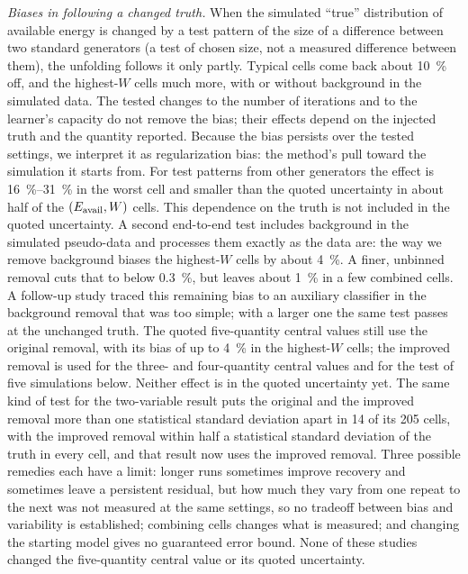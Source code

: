 \emph{Biases in following a changed truth.} When the simulated ``true'' distribution of available energy is changed by a test pattern of the size of a difference between two standard generators (a test of chosen size, not a measured difference between them), the unfolding follows it only partly. Typical cells come back about \SI{10}{\percent} off, and the highest-$W$ cells much more, with or without background in the simulated data. The tested changes to the number of iterations and to the learner's capacity do not remove the bias; their effects depend on the injected truth and the quantity reported. Because the bias persists over the tested settings, we interpret it as regularization bias: the method's pull toward the simulation it starts from. For test patterns from other generators the effect is \SIrange{16}{31}{\percent} in the worst cell and smaller than the quoted uncertainty in about half of the $(E_{\mathrm{avail}},W)$ cells. This dependence on the truth is not included in the quoted uncertainty. A second end-to-end test includes background in the simulated pseudo-data and processes them exactly as the data are: the way we remove background biases the highest-$W$ cells by about \SI{4}{\percent}. A finer, unbinned removal cuts that to below \SI{0.3}{\percent}, but leaves about \SI{1}{\percent} in a few combined cells. A follow-up study traced this remaining bias to an auxiliary classifier in the background removal that was too simple; with a larger one the same test passes at the unchanged truth. The quoted five-quantity central values still use the original removal, with its bias of up to \SI{4}{\percent} in the highest-$W$ cells; the improved removal is used for the three- and four-quantity central values and for the test of five simulations below. Neither effect is in the quoted uncertainty yet. The same kind of test for the two-variable result puts the original and the improved removal more than one statistical standard deviation apart in 14 of its 205 cells, with the improved removal within half a statistical standard deviation of the truth in every cell, and that result now uses the improved removal. Three possible remedies each have a limit: longer runs sometimes improve recovery and sometimes leave a persistent residual, but how much they vary from one repeat to the next was not measured at the same settings, so no tradeoff between bias and variability is established; combining cells changes what is measured; and changing the starting model gives no guaranteed error bound. None of these studies changed the five-quantity central value or its quoted uncertainty.
